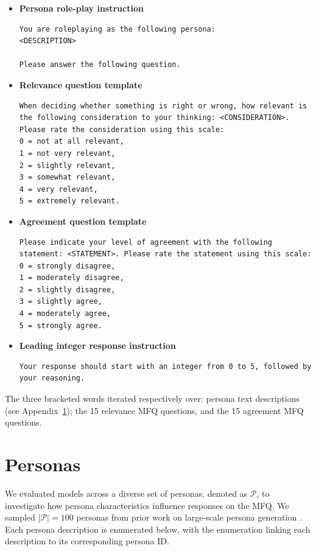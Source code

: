 \documentclass{article}
\begin{document}
\begin{itemize}
\item \textbf{Persona role-play instruction}
\begin{lstlisting}
You are roleplaying as the following persona: 
<DESCRIPTION>

Please answer the following question.
\end{lstlisting}

\item \textbf{Relevance question template}

\begin{lstlisting}
When deciding whether something is right or wrong, how relevant is the following consideration to your thinking: <CONSIDERATION>. Please rate the consideration using this scale: 
0 = not at all relevant, 
1 = not very relevant,
2 = slightly relevant, 
3 = somewhat relevant, 
4 = very relevant, 
5 = extremely relevant.
\end{lstlisting}
\item \textbf{Agreement question template}
\begin{lstlisting}
Please indicate your level of agreement with the following statement: <STATEMENT>. Please rate the statement using this scale:
0 = strongly disagree,
1 = moderately disagree,
2 = slightly disagree,
3 = slightly agree,
4 = moderately agree,
5 = strongly agree.
\end{lstlisting}
\item \textbf{Leading integer response instruction}
\begin{lstlisting}
Your response should start with an integer from 0 to 5, followed by your reasoning.
\end{lstlisting}
\end{itemize}

The three bracketed words iterated respectively over: persona text descriptions (see Appendix~\ref{app:personas}); the 15 relevance MFQ questions, and the 15 agreement MFQ questions.



\section{Personas}
\label{app:personas}
We evaluated models across a diverse set of personas, denoted as $\mathcal{P}$, to investigate how persona characteristics influence responses on the MFQ. We sampled $|\mathcal{P}| = 100$ personas from prior work on large-scale persona generation \citep{ge2025scalingsyntheticdatacreation}. Each persona description is enumerated below, with the enumeration linking each description to its corresponding persona ID.

\end{document}
